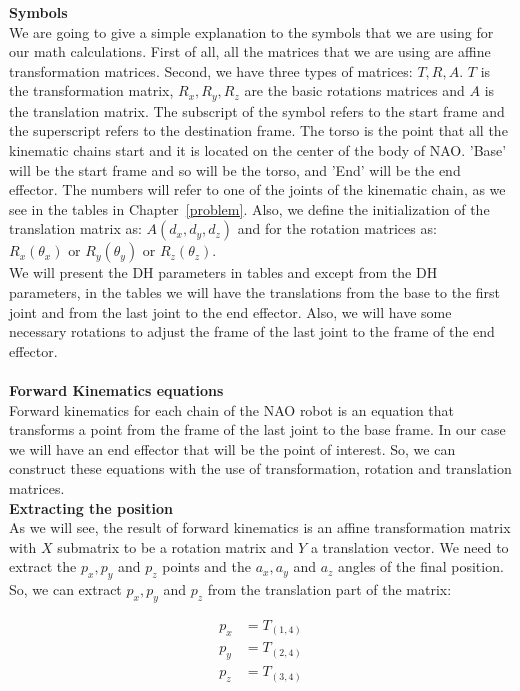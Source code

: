 \textbf{Symbols}\\
We are going to give a simple explanation to the symbols that we are using for our math calculations. First of all, all the matrices that we are using are affine transformation matrices. Second, we have three types of matrices: \(T,R,A\). \(T\) is the transformation matrix, \(R_x, R_y, R_z\) are the basic rotations matrices and \(A\) is the translation matrix. The subscript of the symbol refers to the start frame and the superscript refers to the destination frame. The torso is the point that all the kinematic chains start and it is located on the center of the body of NAO. 'Base' will be the start frame and so will be the torso, and 'End' will be the end effector. The numbers will refer to one of the joints of the kinematic chain, as we see in the tables in Chapter~\ref{problem}. Also, we define the initialization of the translation matrix as: \(A(d_x,d_y,d_z)\) and for the rotation matrices as: \(R_x(\theta_x) \text{ or } R_y(\theta_y) \text{ or } R_z(\theta_z)\).\\
We will present the DH parameters in tables and except from the DH parameters, in the tables we will have the translations from the base to the first joint and from the last joint to the end effector. Also, we will have some necessary rotations to adjust the frame of the last joint to the frame of the end effector.\\
\\

\textbf{Forward Kinematics equations}\\
Forward kinematics for each chain of the NAO robot is an equation that transforms a point from the frame of the last joint to the base frame. In our case we will have an end effector that will be the point of interest. So, we can construct these equations with the use of transformation, rotation and translation matrices.\\

\textbf{Extracting the position}\\
As we will see, the result of forward kinematics is an affine transformation matrix with \(X\) submatrix to be a rotation matrix and \(Y\) a translation vector. We need to extract the \(p_x,p_y\) and \(p_z\) points and the \(a_x,a_y\) and \(a_z\) angles of the final position. So, we can extract \(p_x,p_y\) and \(p_z\) from the translation part of the matrix:
\begin{small}
\begin{align*}
p_x &= T_{(1,4)}\\
p_y &= T_{(2,4)}\\
p_z &= T_{(3,4)}
\end{align*}
\end{small}

